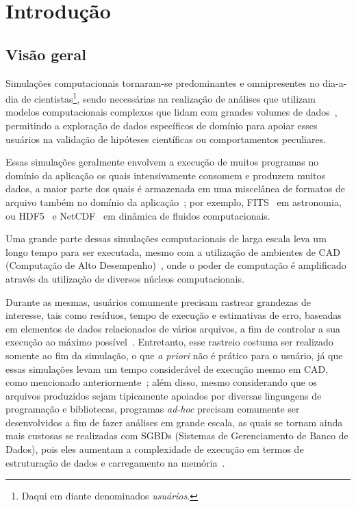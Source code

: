 
\chapter{Introdução}

\section{Visão geral}

Simulações computacionais tornaram-se predominantes e omnipresentes no dia-a-dia de cientistas\footnote{Daqui em diante denominados \textit{usuários}.}, sendo necessárias na realização de análises que utilizam modelos computacionais complexos que lidam com grandes volumes de dados~\cite{silva2015analyzing}, permitindo a exploração de dados específicos de domínio para apoiar esses usuários na validação de hipóteses científicas ou comportamentos peculiares.

Essas simulações geralmente envolvem a execução de muitos programas no domínio da aplicação os quais intensivamente consomem e produzem muitos dados, a maior parte dos quais é armazenada em uma miscelânea de formatos de arquivo também no domínio da aplicação~\cite{silva2015analyzing}; por exemplo,  FITS~\cite{greisen2002representations} em astronomia, ou  HDF5~\cite{hdfgroup2014hdf5} e  NetCDF~\cite{rew1990netcdf} em dinâmica de fluidos computacionais.

Uma grande parte dessas simulações computacionais de larga escala leva um longo tempo para ser executada, mesmo com a utilização de ambientes de  CAD (Computação de Alto Desempenho)~\cite{silva2017raw}, onde o poder de computação é amplificado através da utilização de diversos núcleos computacionais.

Durante as mesmas, usuários comumente precisam rastrear grandezas de interesse, tais como resíduos, tempo de execução e estimativas de erro, baseadas em elementos de dados relacionados de vários arquivos, a fim de controlar a sua execução ao máximo possível~\cite{silva2016situ}.
Entretanto, esse rastreio costuma ser realizado somente ao fim da simulação, o que \textit{a priori} não é prático para o usuário, já que essas simulações levam um tempo considerável de execução mesmo em CAD, como mencionado anteriormente~\cite{silva2017raw}; além disso, mesmo considerando que os arquivos produzidos sejam tipicamente apoiados por diversas linguagens de programação e bibliotecas, programas \textit{ad-hoc} precisam comumente ser desenvolvidos a fim de fazer análises em grande escala, as quais se tornam ainda mais custosas se realizadas com  SGBDs (Sistemas de Gerenciamento de Banco de Dados), pois eles aumentam a complexidade de execução em termos de estruturação de dados e carregamento na memória~\cite{silva2015analyzing}.

